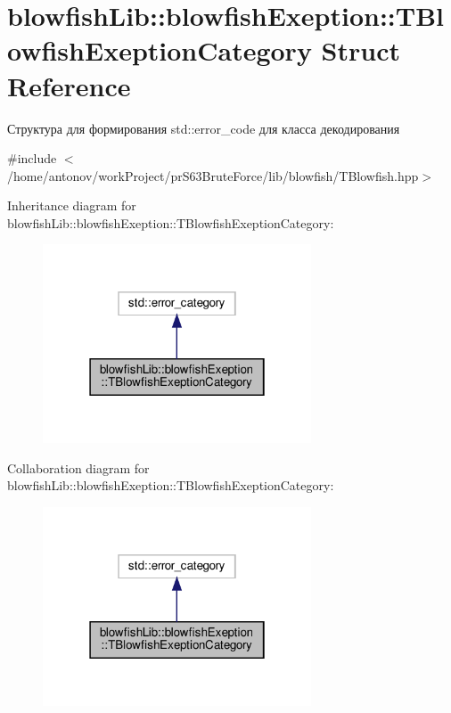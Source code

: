 \hypertarget{structblowfish_lib_1_1blowfish_exeption_1_1_t_blowfish_exeption_category}{}\section{blowfish\+Lib\+:\+:blowfish\+Exeption\+:\+:T\+Blowfish\+Exeption\+Category Struct Reference}
\label{structblowfish_lib_1_1blowfish_exeption_1_1_t_blowfish_exeption_category}


Структура для формирования std\+::error\+\_\+code для класса декодирования  




{\ttfamily \#include $<$/home/antonov/work\+Project/pr\+S63\+Brute\+Force/lib/blowfish/\+T\+Blowfish.\+hpp$>$}



Inheritance diagram for blowfish\+Lib\+:\+:blowfish\+Exeption\+:\+:T\+Blowfish\+Exeption\+Category\+:\nopagebreak
\begin{figure}[H]
\begin{center}
\leavevmode
\includegraphics[width=226pt]{structblowfish_lib_1_1blowfish_exeption_1_1_t_blowfish_exeption_category__inherit__graph}
\end{center}
\end{figure}


Collaboration diagram for blowfish\+Lib\+:\+:blowfish\+Exeption\+:\+:T\+Blowfish\+Exeption\+Category\+:\nopagebreak
\begin{figure}[H]
\begin{center}
\leavevmode
\includegraphics[width=226pt]{structblowfish_lib_1_1blowfish_exeption_1_1_t_blowfish_exeption_category__coll__graph}
\end{center}
\end{figure}
